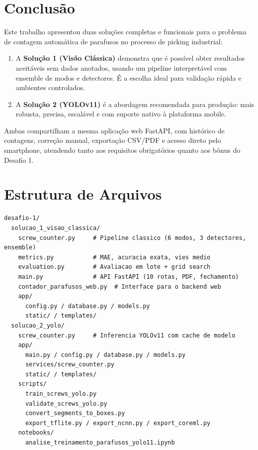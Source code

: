 \documentclass[12pt,a4paper]{article}
\begin{document}
\section{Conclus\~ao}

Este trabalho apresentou duas solu\c{c}\~oes completas e funcionais para o problema
de contagem autom\'atica de parafusos no processo de picking industrial:

\begin{enumerate}[leftmargin=*, label=\arabic*.]
  \item A \textbf{Solu\c{c}\~ao 1 (Vis\~ao Cl\'assica)} demonstra que \'e poss\'ivel
        obter resultados aceit\'aveis sem dados anotados, usando um pipeline
        interpret\'avel com ensemble de modos e detectores. \'E a escolha ideal
        para valida\c{c}\~ao r\'apida e ambientes controlados.

  \item A \textbf{Solu\c{c}\~ao 2 (YOLOv11)} \'e a abordagem recomendada para
        produ\c{c}\~ao: mais robusta, precisa, escal\'avel e com suporte nativo
        \`a plataforma mobile.
\end{enumerate}

Ambas compartilham a mesma aplica\c{c}\~ao web FastAPI, com hist\'orico de
contagens, corre\c{c}\~ao manual, exporta\c{c}\~ao CSV/PDF e acesso direto pelo
smartphone, atendendo tanto aos requisitos obrigat\'orios quanto aos b\^onus
do Desafio 1.

\appendix
\section{Estrutura de Arquivos}

\begin{verbatim}
desafio-1/
  solucao_1_visao_classica/
    screw_counter.py     # Pipeline classico (6 modos, 3 detectores, ensemble)
    metrics.py           # MAE, acuracia exata, vies medio
    evaluation.py        # Avaliacao em lote + grid search
    main.py              # API FastAPI (10 rotas, PDF, fechamento)
    contador_parafusos_web.py  # Interface para o backend web
    app/
      config.py / database.py / models.py
      static/ / templates/
  solucao_2_yolo/
    screw_counter.py     # Inferencia YOLOv11 com cache de modelo
    app/
      main.py / config.py / database.py / models.py
      services/screw_counter.py
      static/ / templates/
    scripts/
      train_screws_yolo.py
      validate_screws_yolo.py
      convert_segments_to_boxes.py
      export_tflite.py / export_ncnn.py / export_coreml.py
    notebooks/
      analise_treinamento_parafusos_yolo11.ipynb
\end{verbatim}
\end{document}
